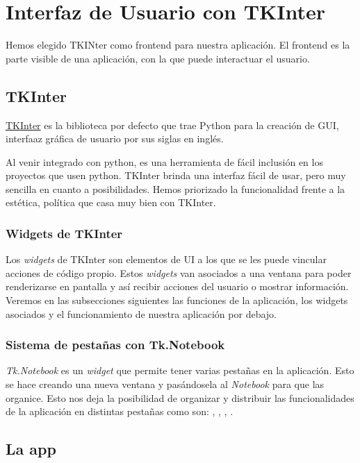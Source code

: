 \chapter{Interfaz de Usuario con TKInter}
\label{cap:GUIconTKInter}
Hemos elegido TKINter como frontend para nuestra aplicación. El frontend es la parte visible de una aplicación, con la que puede interactuar el usuario.

\section{TKInter}
\label{sec:TK}
\href{https://docs.python.org/es/3/library/tkinter.html}{TKInter} es la biblioteca por defecto que trae Python para la creación de GUI, interfaaz gráfica de usuario por sus siglas en inglés.

Al venir integrado con python, es una herramienta de fácil inclusión en los proyectos que usen python. TKInter brinda una interfaz fácil de usar, pero muy sencilla en cuanto a posibilidades. Hemos priorizado la funcionalidad frente a la estética, política que casa muy bien con TKInter.

\subsection{Widgets de TKInter}
Los \textit{widgets} de TKInter son elementos de UI a los que se les puede vincular acciones de código propio. Estos \textit{widgets} van asociados a una ventana para poder renderizarse en pantalla y así recibir acciones del usuario o mostrar información. Veremos en las subsecciones siguientes las funciones de la aplicación, los widgets asociados y el funcionamiento de nuestra aplicación por debajo.

\subsection{Sistema de pestañas con Tk.Notebook}
\textit{Tk.Notebook} es un \textit{widget} que permite tener varias pestañas en la aplicación. Esto se hace creando una nueva ventana y pasándosela al \textit{Notebook} para que las organice. Esto nos deja la posibilidad de organizar y distribuir las funcionalidades de la aplicación en distintas pestañas como son: \generationTabName{}, \tematicTabName{}, \advancedTabName{}, \configTabName{}.

\section{La app}
\label{sec:TK:app}


